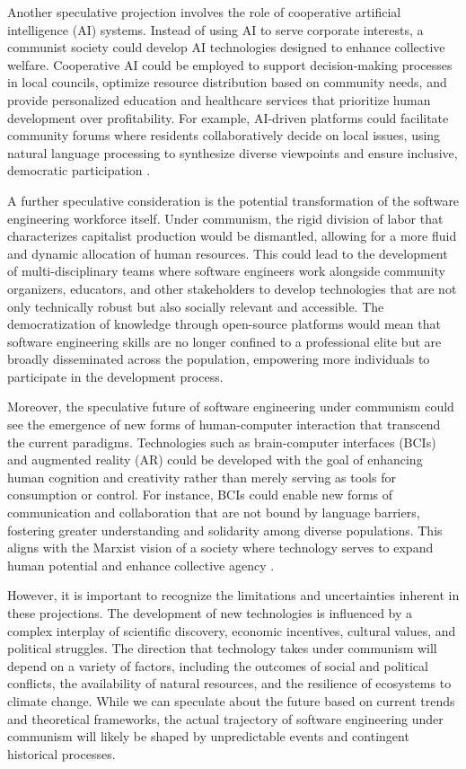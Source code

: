Another speculative projection involves the role of cooperative artificial intelligence (AI) systems. Instead of using AI to serve corporate interests, a communist society could develop AI technologies designed to enhance collective welfare. Cooperative AI could be employed to support decision-making processes in local councils, optimize resource distribution based on community needs, and provide personalized education and healthcare services that prioritize human development over profitability. For example, AI-driven platforms could facilitate community forums where residents collaboratively decide on local issues, using natural language processing to synthesize diverse viewpoints and ensure inclusive, democratic participation \cite[pp.~205-210]{CooperativeAI2024}.

A further speculative consideration is the potential transformation of the software engineering workforce itself. Under communism, the rigid division of labor that characterizes capitalist production would be dismantled, allowing for a more fluid and dynamic allocation of human resources. This could lead to the development of multi-disciplinary teams where software engineers work alongside community organizers, educators, and other stakeholders to develop technologies that are not only technically robust but also socially relevant and accessible. The democratization of knowledge through open-source platforms would mean that software engineering skills are no longer confined to a professional elite but are broadly disseminated across the population, empowering more individuals to participate in the development process.

Moreover, the speculative future of software engineering under communism could see the emergence of new forms of human-computer interaction that transcend the current paradigms. Technologies such as brain-computer interfaces (BCIs) and augmented reality (AR) could be developed with the goal of enhancing human cognition and creativity rather than merely serving as tools for consumption or control. For instance, BCIs could enable new forms of communication and collaboration that are not bound by language barriers, fostering greater understanding and solidarity among diverse populations. This aligns with the Marxist vision of a society where technology serves to expand human potential and enhance collective agency \cite[pp.~101-105]{BCIFuture2023}.

However, it is important to recognize the limitations and uncertainties inherent in these projections. The development of new technologies is influenced by a complex interplay of scientific discovery, economic incentives, cultural values, and political struggles. The direction that technology takes under communism will depend on a variety of factors, including the outcomes of social and political conflicts, the availability of natural resources, and the resilience of ecosystems to climate change. While we can speculate about the future based on current trends and theoretical frameworks, the actual trajectory of software engineering under communism will likely be shaped by unpredictable events and contingent historical processes.

